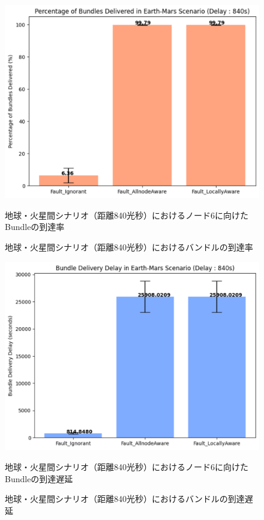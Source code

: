 \begin{figure}[tbh]
    \centering
    \includegraphics[width=0.7\textheight]{results/mars_distance_840/mars_840_bundle.pdf}
    \caption{地球・火星間シナリオ（距離840光秒）におけるバンドルの到達率}
    \label{fig:graph_bundle_earth_mars_840}
    \begin{minipage}{\textwidth}
        \centering
        \vspace{3mm}
        地球・火星間シナリオ（距離840光秒）におけるノード6に向けたBundleの到達率
    \end{minipage}
\end{figure}

\begin{figure}[tbh]
    \centering
    \includegraphics[width=0.7\textheight]{results/mars_distance_840/mars_840_delay.pdf}
    \caption{地球・火星間シナリオ（距離840光秒）におけるバンドルの到達遅延}
    \label{fig:graph_delay_earth_mars_840}
    \begin{minipage}{\textwidth}
        \centering
        \vspace{3mm}
        地球・火星間シナリオ（距離840光秒）におけるノード6に向けたBundleの到達遅延
    \end{minipage}
\end{figure}

